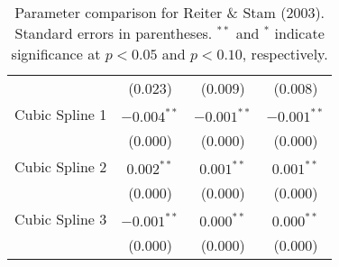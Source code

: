 \begin{table}[ht]
\begin{tabular}{lccc}
   & (0.023) & (0.009) & (0.008) \\ 
  Cubic Spline 1 & $-0.004^{\ast\ast}$ & $-0.001^{\ast\ast}$ & $-0.001^{\ast\ast}$ \\ 
   & (0.000) & (0.000) & (0.000) \\ 
  Cubic Spline 2 & $0.002^{\ast\ast}$ & $0.001^{\ast\ast}$ & $0.001^{\ast\ast}$ \\ 
   & (0.000) & (0.000) & (0.000) \\ 
  Cubic Spline 3 & $-0.001^{\ast\ast}$ & $0.000^{\ast\ast}$ & $0.000^{\ast\ast}$ \\ 
   & (0.000) & (0.000) & (0.000) \\ 
   \hline
\hline
\end{tabular}
\endgroup
\caption{Parameter comparison for Reiter \& Stam (2003). Standard errors in parentheses. $^{**}$ and $^{*}$ indicate significance at $p<0.05$ and $p<0.10$, respectively.} 
\label{tab:reiter_stam_coef}
\end{table}